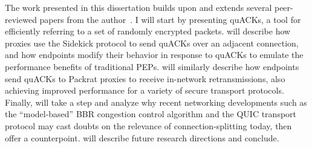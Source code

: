 The work presented in this dissertation builds upon and extends several
peer-reviewed papers from the author~\cite{yuan2022sidecar,yuan2024sidekick,yuan2025internet}.
I will start  by presenting quACKs, a tool for efficiently
referring to a set of randomly encrypted packets.
 will describe how proxies use the Sidekick protocol to send
quACKs over an adjacent connection, and how endpoints modify their behavior in
response to quACKs to emulate the performance benefits of traditional
PEPs.
 will similarly describe how endpoints send quACKs to Packrat
proxies to receive in-network retransmissions, also achieving improved
performance for a variety of secure transport protocols.
Finally,  will take a step and analyze why recent networking
developments such as the ``model-based'' BBR congestion control algorithm and
the QUIC transport protocol may cast doubts on the relevance of
connection-splitting today, then offer a counterpoint.
 will describe future research directions and conclude.





